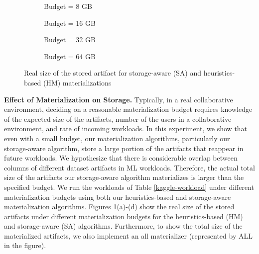 \begin{figure}[h]
\begin{subfigure}[b]{0.5\linewidth}
\centering
 \resizebox{\columnwidth}{!}{%
%
}
\caption{Budget = 8 GB}
\end{subfigure}%
\begin{subfigure}[b]{0.5\linewidth}
\centering
 \resizebox{\columnwidth}{!}{%
%
}
\caption{Budget = 16 GB}
\end{subfigure}
\begin{subfigure}[b]{0.5\linewidth}
\centering
 \resizebox{\columnwidth}{!}{%
%
}
\caption{Budget = 32 GB}
\end{subfigure}%
\begin{subfigure}[b]{0.5\linewidth}
\centering
 \resizebox{\columnwidth}{!}{%
%
}
\caption{Budget = 64 GB}
\end{subfigure}
\caption{Real size of the stored artifact for storage-aware (SA) and heuristics-based (HM) materializations}
\label{exp-sa-vs-simple-size}
\end{figure}
\textbf{Effect of Materialization on Storage.}
Typically, in a real collaborative environment, deciding on a reasonable materialization budget requires knowledge of the expected size of the artifacts, number of the users in a collaborative environment, and rate of incoming workloads.
In this experiment, we show that even with a small budget, our materialization algorithms, particularly our storage-aware algorithm, store a large portion of the artifacts that reappear in future workloads.
We hypothesize that there is considerable overlap between columns of different dataset artifacts in ML workloads.
Therefore, the actual total size of the artifacts our storage-aware algorithm materializes is larger than the specified budget.
We run the workloads of Table \ref{kaggle-workload} under different materialization budgets using both our heuristics-based and storage-aware materialization algorithms.
Figures \ref{exp-sa-vs-simple-size}(a)-(d) show the real size of the stored artifacts under different materialization budgets for the heuristics-based (HM) and storage-aware (SA) algorithms.
Furthermore, to show the total size of the materialized artifacts, we also implement an all materializer (represented by ALL in the figure).

